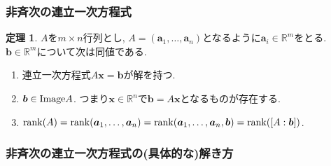 \documentclass[dvipdfmx,a4paper,11pt]{article}
\newcommand{\R}{\mathbb{R}}
\theoremstyle{definition}
\newtheorem{thm}{定理}
\begin{document}
\subsubsection{非斉次の連立一次方程式}
\begin{tcolorbox}[
    colback = white,
    colframe = green!35!black,
    fonttitle = \bfseries,
    breakable = true]
    \begin{thm}\cite[定理2.8]{M}
    $A$を$m \times n$行列とし, $A=(\bm{a}_1, \ldots, \bm{a}_n)$となるように$\bm{a}_i \in \R^m$をとる. 
    $\bm{b} \in \R^m$について次は同値である. 
     \begin{enumerate}
    \setlength{\parskip}{0cm} 
  \setlength{\itemsep}{0cm}
 \item 連立一次方程式$A\bm{x} =\bm{b}$が解を持つ.
 \item $\bm{b} \in {\rm Image}A$. つまり$\bm{x} \in \R^n$で$\bm{b}=A\bm{x}$となるものが存在する. 
 \item${\rm rank}(A)={\rm rank}(\bm{a}_1, \ldots, \bm{a}_n) = {\rm rank}(\bm{a}_1, \ldots, \bm{a}_n, \bm{b}) ={\rm rank}( [A:\bm{b}])$.
 \end{enumerate}
  \end{thm}
 \end{tcolorbox}
 

\subsubsection{非斉次の連立一次方程式の(具体的な)解き方}
\end{document}
